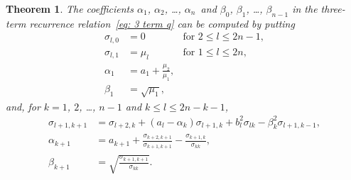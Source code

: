 \documentclass[12pt,a4paper]{article}
\newtheorem{theorem}{Theorem}
\begin{document}
\begin{theorem}
The coefficients $\alpha_1$, $\alpha_2$, \dots, $\alpha_n$~and 
$\beta_0$, $\beta_1$, \dots, $\beta_{n-1}$ in the three-term 
recurrence relation~\eqref{eq: 3 term q} can be computed by putting
\[
\begin{aligned}
\sigma_{l,0}&=0&\text{for $2\le l\le 2n-1$},\\
\sigma_{l,1}&=\mu_l&\text{for $1\le l\le2n$},\\
\alpha_1&=a_1+\frac{\mu_2}{\mu_1},\\
\beta_1&=\sqrt{\mu_1},
\end{aligned} 
\]
and, for $k=1$, $2$, \dots, $n-1$ and $k\le l\le2n-k-1$, 
\[
\begin{aligned}
\sigma_{l+1,k+1}&=\sigma_{l+2,k}+(a_l-\alpha_k)\sigma_{l+1,k}
		+b_l^2\sigma_{lk}-\beta_k^2\sigma_{l+1,k-1},\\
\alpha_{k+1}&=a_{k+1}+\frac{\sigma_{k+2,k+1}}{\sigma_{k+1,k+1}}
	-\frac{\sigma_{k+1,k}}{\sigma_{kk}},\\
\beta_{k+1}&=\sqrt{\frac{\sigma_{k+1,k+1}}{\sigma_{kk}}}.
\end{aligned}
\]
\end{theorem}
\end{document}
